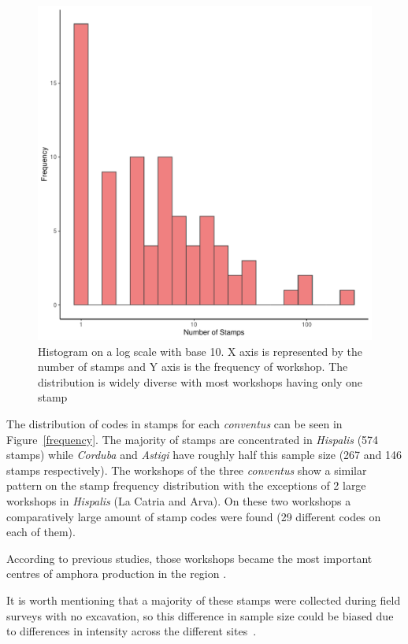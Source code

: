 \begin{figure}[htp]
	\centering
\includegraphics[width=\linewidth]{frequencystamp.pdf}
\caption{Histogram on a log scale with base 10. X axis is represented by the number of stamps and Y axis is the frequency of workshop. The distribution is widely diverse with most workshops having only one stamp}
\label{stamps}
\end{figure} 

The distribution of codes in stamps for each \textit{conventus} can be seen in Figure~\ref{frequency}. The majority of stamps are concentrated in \textit{Hispalis} (574 stamps) while \textit{Corduba} and \textit{Astigi} have roughly half this sample size (267 and 146 stamps respectively). The workshops of the three \textit{conventus} show a similar pattern on the stamp frequency distribution with the exceptions of 2 large workshops in \textit{Hispalis} (La Catria and Arva). On these two workshops a comparatively large amount of stamp codes were found (29 different codes on each of them).

According to previous studies, those workshops became the most important centres of amphora production in the region \citep{rodriguez_economioleicola_1977,
arva_1997}.

It is worth mentioning that a majority of these stamps were collected during field surveys with no excavation, so this difference in sample size could be biased due to differences in intensity across the different sites~\citep{arva_1997}.
 

